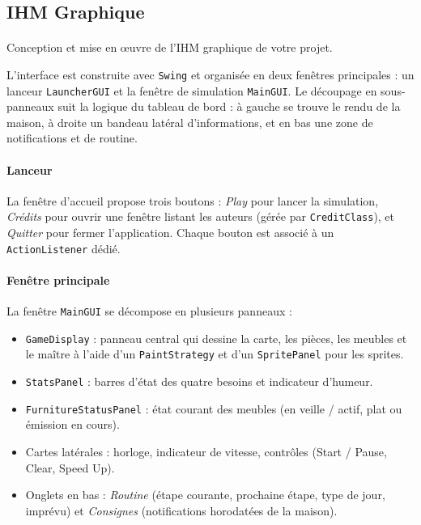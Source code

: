 \subsection{IHM Graphique}

\paragraph{} Conception et mise en œuvre de l'IHM graphique de votre projet. 

L'interface est construite avec \texttt{Swing} et organisée en deux fenêtres principales : un lanceur \texttt{LauncherGUI} et la fenêtre de simulation \texttt{MainGUI}. Le découpage en sous-panneaux suit la logique du tableau de bord : à gauche se trouve le rendu de la maison, à droite un bandeau latéral d'informations, et en bas une zone de notifications et de routine.

\paragraph{Lanceur} La fenêtre d'accueil propose trois boutons : \textit{Play} pour lancer la simulation, \textit{Crédits} pour ouvrir une fenêtre listant les auteurs (gérée par \texttt{CreditClass}), et \textit{Quitter} pour fermer l'application. Chaque bouton est associé à un \texttt{ActionListener} dédié.


\paragraph{Fenêtre principale} La fenêtre \texttt{MainGUI} se décompose en plusieurs panneaux :
\begin{itemize}
\item \texttt{GameDisplay} : panneau central qui dessine la carte, les pièces, les meubles et le maître à l'aide d'un \texttt{PaintStrategy} et d'un \texttt{SpritePanel} pour les sprites.
\item \texttt{StatsPanel} : barres d'état des quatre besoins et indicateur d'humeur.
\item \texttt{FurnitureStatusPanel} : état courant des meubles (en veille / actif, plat ou émission en cours).
\item Cartes latérales : horloge, indicateur de vitesse, contrôles (Start / Pause, Clear, Speed Up).
\item Onglets en bas : \textit{Routine} (étape courante, prochaine étape, type de jour, imprévu) et \textit{Consignes} (notifications horodatées de la maison).
\end{itemize}

